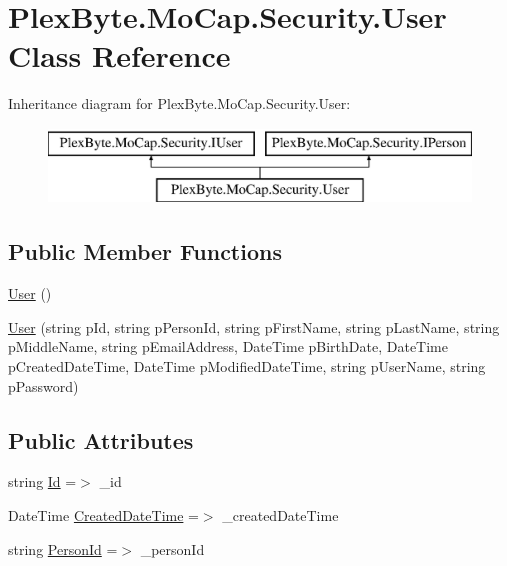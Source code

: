 \hypertarget{class_plex_byte_1_1_mo_cap_1_1_security_1_1_user}{}\section{Plex\+Byte.\+Mo\+Cap.\+Security.\+User Class Reference}
\label{class_plex_byte_1_1_mo_cap_1_1_security_1_1_user}
Inheritance diagram for Plex\+Byte.\+Mo\+Cap.\+Security.\+User\+:\begin{figure}[H]
\begin{center}
\leavevmode
\includegraphics[height=2.000000cm]{class_plex_byte_1_1_mo_cap_1_1_security_1_1_user}
\end{center}
\end{figure}
\subsection*{Public Member Functions}
\begin{DoxyCompactItemize}
\item 
\hyperlink{class_plex_byte_1_1_mo_cap_1_1_security_1_1_user_a6d7f4d78f74f47c5f64e46ddf59043b1}{User} ()
\item 
\hyperlink{class_plex_byte_1_1_mo_cap_1_1_security_1_1_user_a3e87bb7b52983c083cd15886b61989a6}{User} (string p\+Id, string p\+Person\+Id, string p\+First\+Name, string p\+Last\+Name, string p\+Middle\+Name, string p\+Email\+Address, Date\+Time p\+Birth\+Date, Date\+Time p\+Created\+Date\+Time, Date\+Time p\+Modified\+Date\+Time, string p\+User\+Name, string p\+Password)
\end{DoxyCompactItemize}
\subsection*{Public Attributes}
\begin{DoxyCompactItemize}
\item 
string \hyperlink{class_plex_byte_1_1_mo_cap_1_1_security_1_1_user_a3e485cc6481d7d6c144e1f7c4818e611}{Id} =$>$ \+\_\+id
\item 
Date\+Time \hyperlink{class_plex_byte_1_1_mo_cap_1_1_security_1_1_user_a97a30ece2396be6bae1a88b47cf518d0}{Created\+Date\+Time} =$>$ \+\_\+created\+Date\+Time
\item 
string \hyperlink{class_plex_byte_1_1_mo_cap_1_1_security_1_1_user_a88a5440cb0d728dedb9f7fc59033f39e}{Person\+Id} =$>$ \+\_\+person\+Id
\end{DoxyCompactItemize}
